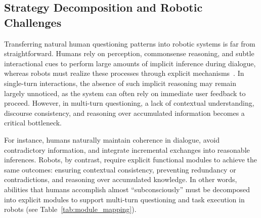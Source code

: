 \documentclass[sigconf,authordraft]{acmart}
\begin{document}
\subsection{Strategy Decomposition and Robotic Challenges}

Transferring natural human questioning patterns into robotic systems is far from straightforward. Humans rely on perception, commonsense reasoning, and subtle interactional cues to perform large amounts of implicit inference during dialogue, whereas robots must realize these processes through explicit mechanisms~\cite{strachan2024testing}. In single-turn interactions, the absence of such implicit reasoning may remain largely unnoticed, as the system can often rely on immediate user feedback to proceed. However, in multi-turn questioning, a lack of contextual understanding, discourse consistency, and reasoning over accumulated information becomes a critical bottleneck. 

For instance, humans naturally maintain coherence in dialogue, avoid contradictory information, and integrate incremental exchanges into reasonable inferences. Robots, by contrast, require explicit functional modules to achieve the same outcomes: ensuring contextual consistency, preventing redundancy or contradictions, and reasoning over accumulated knowledge. In other words, abilities that humans accomplish almost ``subconsciously'' must be decomposed into explicit modules to support multi-turn questioning and task execution in robots (see Table~\ref{tab:module_mapping}).
\end{document}
